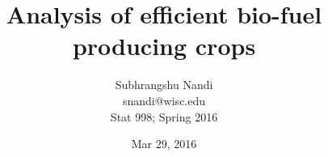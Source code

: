 \documentclass[12pt]{article}
\begin{document}
\title{Analysis of efficient bio-fuel producing crops}

\author{Subhrangshu Nandi \\
	snandi@wisc.edu \\	
	Stat 998; Spring 2016}
\date{Mar 29, 2016}

\maketitle









\newpage
\begin{appendix}

\end{appendix}
\end{document}
